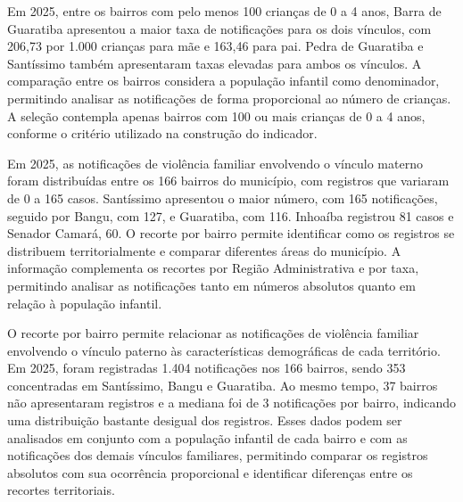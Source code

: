 Em 2025, entre os bairros com pelo menos 100 crianças de 0 a 4 anos, Barra de Guaratiba apresentou a maior taxa de notificações para os dois vínculos, com 206,73 por 1.000 crianças para mãe e 163,46 para pai. Pedra de Guaratiba e Santíssimo também apresentaram taxas elevadas para ambos os vínculos. A comparação entre os bairros considera a população infantil como denominador, permitindo analisar as notificações de forma proporcional ao número de crianças. A seleção contempla apenas bairros com 100 ou mais crianças de 0 a 4 anos, conforme o critério utilizado na construção do indicador.


Em 2025, as notificações de violência familiar envolvendo o vínculo materno foram distribuídas entre os 166 bairros do município, com registros que variaram de 0 a 165 casos. Santíssimo apresentou o maior número, com 165 notificações, seguido por Bangu, com 127, e Guaratiba, com 116. Inhoaíba registrou 81 casos e Senador Camará, 60. O recorte por bairro permite identificar como os registros se distribuem territorialmente e comparar diferentes áreas do município. A informação complementa os recortes por Região Administrativa e por taxa, permitindo analisar as notificações tanto em números absolutos quanto em relação à população infantil.


O recorte por bairro permite relacionar as notificações de violência familiar envolvendo o vínculo paterno às características demográficas de cada território. Em 2025, foram registradas 1.404 notificações nos 166 bairros, sendo 353 concentradas em Santíssimo, Bangu e Guaratiba. Ao mesmo tempo, 37 bairros não apresentaram registros e a mediana foi de 3 notificações por bairro, indicando uma distribuição bastante desigual dos registros. Esses dados podem ser analisados em conjunto com a população infantil de cada bairro e com as notificações dos demais vínculos familiares, permitindo comparar os registros absolutos com sua ocorrência proporcional e identificar diferenças entre os recortes territoriais.

